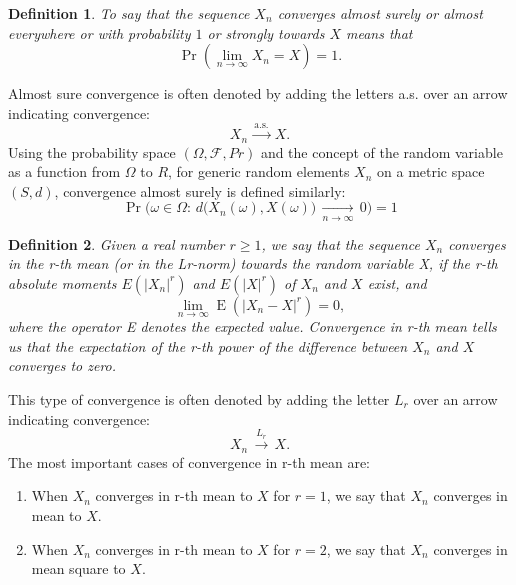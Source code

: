 \documentclass[11pt]{article}
\newtheorem{definition}{Definition}[section]
\begin{document}
\begin{definition}
To say that the sequence $X_n$ converges almost surely or almost everywhere or with probability $1$ or strongly towards $X$ means that
$$
    \operatorname{Pr}\!\left( \lim_{n\to\infty}\! X_n = X \right) = 1. 
$$
\end{definition}
Almost sure convergence is often denoted by adding the letters a.s. over an arrow indicating convergence:
$$X_n \, \xrightarrow{\mathrm{a.s.}} \, X.$$ 
Using the probability space $\scriptstyle (\Omega, \mathcal{F}, Pr )$ and the concept of the random variable as a function from $\Omega$ to $R$, for generic random elements ${X_n}$ on a metric space $(S, d)$, convergence almost surely is defined similarly:
$$
    \operatorname{Pr}\Big( \omega\in\Omega:\, d\big(X_n(\omega),X(\omega)\big)\,\underset{n\to\infty}{\longrightarrow}\,0 \Big) = 1
$$
\begin{definition}
Given a real number $r \geq 1$, we say that the sequence $X_n$ converges in the r-th mean (or in the Lr-norm) towards the random variable X, if the r-th absolute moments $E(|X_n|^r)$ and $E(|X|^r)$ of $X_n$ and $X$ exist, and
$$
    \lim_{n\to\infty} \operatorname{E}\left( |X_n-X|^r \right) = 0, 
$$
where the operator E denotes the expected value. Convergence in r-th mean tells us that the expectation of the r-th power of the difference between $X_n$ and $X$ converges to zero.
\end{definition}
This type of convergence is often denoted by adding the letter $L_r$ over an arrow indicating convergence:
$$
    X_n \, \xrightarrow{L_r} \, X. 
$$
The most important cases of convergence in r-th mean are:
\begin{enumerate}
\item When $X_n$ converges in r-th mean to $X$ for $r = 1$, we say that $X_n$ converges in mean to $X$.
\item     When $X_n$ converges in r-th mean to $X$ for $r = 2$, we say that $X_n$ converges in mean square to $X$.
\end{enumerate}
\end{document}
